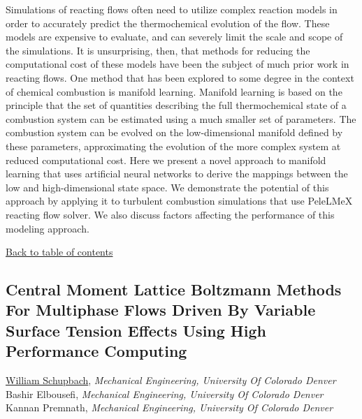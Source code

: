 \noindent Simulations of reacting flows often need to utilize complex reaction models in order to accurately predict the thermochemical evolution of the flow. These models are expensive to evaluate, and can severely limit the scale and scope of the simulations. It is unsurprising, then, that methods for reducing the computational cost of these models have been the subject of much prior work in reacting flows. One method that has been explored to some degree in the context of chemical combustion is manifold learning. Manifold learning is based on the principle that the set of quantities describing the full thermochemical state of a combustion system can be estimated using a much smaller set of parameters. The combustion system can be evolved on the low-dimensional manifold defined by these parameters, approximating the evolution of the more complex system at reduced computational cost. Here we present a novel approach to manifold learning that uses artificial neural networks to derive the mappings between the low and high-dimensional state space. We demonstrate the potential of this approach by applying it to turbulent combustion simulations that use PeleLMeX reacting flow solver. We also discuss factors affecting the performance of this modeling approach. \\ 
\begin{flushright}\vspace{-0.2 in}\hyperlink{toc}{Back to table of contents}\end{flushright}\vspace{-0.2 in}
\hypertarget{WilliamSchupbach}{\subsection*{\color{CUGOLD} Central Moment Lattice Boltzmann Methods For Multiphase Flows  Driven By Variable Surface Tension Effects Using High Performance Computing}} \vsp 
\underline{William Schupbach}, \textit{Mechanical Engineering, University Of Colorado Denver}\\ 
{Bashir Elbousefi}, \textit{Mechanical Engineering, University Of Colorado Denver}\\ 
{Kannan Premnath}, \textit{Mechanical Engineering, University Of Colorado Denver}\\ 
\vspace{-0.1 in} \\ 
